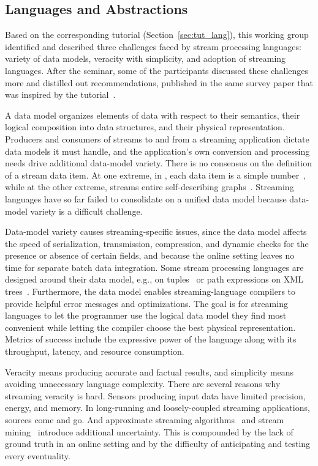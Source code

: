 \subsection{Languages and Abstractions}\label{sec:wg_lang}

Based on the corresponding tutorial (Section~\ref{sec:tut_lang}), this
working group identified and described three challenges faced by
stream processing languages: variety of data models, veracity with
simplicity, and adoption of streaming languages. After the seminar,
some of the participants discussed these challenges more and distilled
out recommendations, published in the same survey paper that was
inspired by the tutorial~\cite{hirzel_et_al_2018}.

\iffalse
{}
A data model organizes elements of data with respect to
their semantics, their logical composition into data structures, and
their physical representation. Producers and consumers of streams to
and from a streaming application dictate data models it must handle,
and the application's own conversion and processing needs drive
additional data-model variety.  There is no consensus on the definition of a stream
data item. At one extreme, in , each data item is a simple
number~\cite{thies_et_al_2002}, while at the other extreme, \mbox{}
streams entire self-describing graphs~\cite{barbieri_et_al_2009}.
Streaming languages have so far failed to consolidate on a unified data model
because data-model variety is a difficult challenge.

Data-model variety causes streaming-specific issues, since the data
model affects the speed of serialization, transmission, compression,
and dynamic checks for the presence or absence of certain fields, and
because the online setting leaves no time for separate batch data
integration. Some stream processing languages are designed around
their data model, e.g.,  on tuples~\cite{arasu_babu_widom_2006} or
path expressions on XML trees~\cite{diao_et_al_2002}. Furthermore, the
data model enables streaming-language compilers to provide helpful
error messages and optimizations. The goal is for streaming languages to let the programmer use the
logical data model they find most convenient while letting the
compiler choose the best physical representation. Metrics of success
include the expressive power of the language along with its throughput,
latency, and resource consumption.

Veracity means producing accurate and factual results, and
simplicity means avoiding unnecessary language complexity. There are
several reasons why streaming veracity is hard. Sensors producing
input data have limited precision, energy, and memory. In
long-running and loosely-coupled streaming applications,
sources come and go. And approximate streaming
algorithms~\cite{babcock_et_al_2002} and stream
mining~\cite{gaber_zaslavsky_krishnaswamy_2005} introduce additional
uncertainty. This is compounded by the lack of ground truth in an
online setting and by the difficulty of anticipating and testing
every eventuality.

